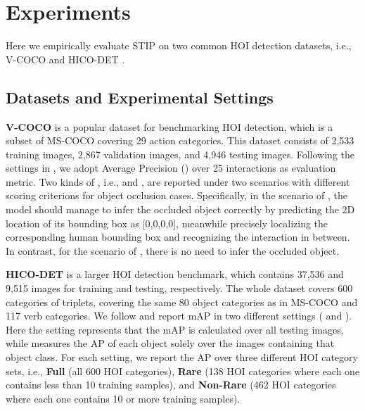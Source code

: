\documentclass[10pt,twocolumn,letterpaper]{article}
\begin{document}
\section{Experiments}
Here we empirically evaluate STIP on two common HOI detection datasets, i.e., V-COCO \cite{gupta2015visual} and HICO-DET \cite{chao2018learning}.

\subsection{Datasets and Experimental Settings}

\textbf{V-COCO} is a popular dataset for benchmarking HOI detection, which is a subset of MS-COCO \cite{lin2014microsoft} covering 29 action categories. This dataset consists of 2,533 training images, 2,867 validation images, and 4,946 testing images. Following the settings in \cite{kim2021hotr}, we adopt Average Precision () over 25 interactions as evaluation metric. Two kinds of , i.e., \textbf{} and \textbf{}, are reported under two scenarios with different scoring criterions for object occlusion cases. Specifically, in the scenario of , the model should manage to infer the occluded object correctly by predicting the 2D location of its bounding box as [0,0,0,0], meanwhile precisely localizing the corresponding human bounding box and recognizing the interaction in between. In contrast, for the scenario of , there is no need to infer the occluded object.



\textbf{HICO-DET} is a larger HOI detection benchmark, which contains 37,536 and 9,515 images for training and testing, respectively. The whole dataset covers 600 categories of {\emph{}} triplets, covering the same 80 object categories as in MS-COCO \cite{lin2014microsoft} and 117 verb categories. We follow \cite{chao2018learning} and report mAP in two different settings (\textbf{} and \textbf{}). Here the  setting represents that the mAP is calculated over all testing images, while  measures the AP of each object solely over the images containing that object class.
For each setting, we report the AP over three different HOI category sets, i.e., \textbf{Full} (all 600 HOI categories), \textbf{Rare} (138 HOI categories where each one contains less than 10 training samples), and \textbf{Non-Rare} (462 HOI categories where each one contains 10 or more training samples).
\end{document}
